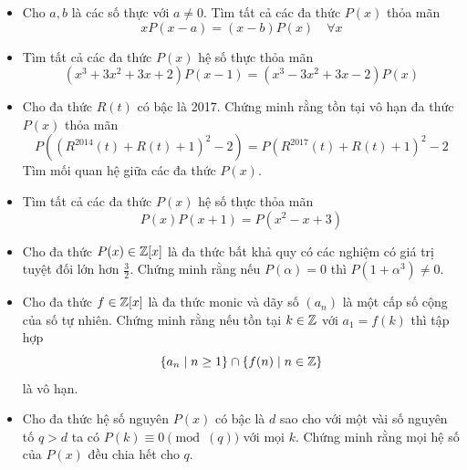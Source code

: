 \documentclass[11pt]{scrartcl}
\begin{document}
\begin{itemize}[label=, leftmargin=0em, itemsep=0.5em]
        \item \begin{btvn} Cho $a,b$ là các số thực với $a \neq 0$. Tìm tất cả các đa thức $P(x)$ thỏa mãn
            $$
            x P(x-a)=(x-b) P(x) \quad \forall x
            $$
        \end{btvn}

        \item \begin{btvn}
            Tìm tất cả các đa thức $P(x)$ hệ số thực thỏa mãn
            \[
                (x^3 + 3x^2 + 3x + 2)P(x - 1) = (x^3 - 3x^2 + 3x -2)P(x)
            \]
        \end{btvn}

        \item \begin{btvn}
            Cho đa thức $R(t)$ có bậc là 2017. Chứng minh rằng tồn tại vô hạn đa thức $P(x)$ thỏa mãn
            \[
                P((R^{2014}(t) + R(t) + 1)^2 - 2) = P(R^{2017}(t) + R(t) + 1)^2 - 2
            \]
            Tìm mối quan hệ giữa các đa thức $P(x)$.
        \end{btvn}

        \item \begin{btvn}
            Tìm tất cả các đa thức $P(x)$ hệ số thực thỏa mãn
            \[
                P(x)P(x + 1) = P(x^2 - x + 3)
            \]
        \end{btvn}

        \item \begin{btvn}
            Cho đa thức $P(x) \in \mathbb{Z}[x]$ là đa thức bất khả quy có các nghiệm có giá trị tuyệt đối lớn hơn $\frac{3}{2}$. Chứng minh rằng nếu $P(\alpha) = 0$ thì $P(1 + \alpha^3) \neq 0$.
        \end{btvn}
        \item \begin{btvn}
            Cho đa thức $f \in \mathbb{Z}[x]$ là đa thức monic và dãy số $(a_n)$ là một cấp số cộng của số tự nhiên. Chứng minh rằng nếu tồn tại $k \in \mathbb{Z}$ với $a_1 = f(k)$ thì tập hợp
            \[
                \{a_n \mid n \geq 1\} \cap \{f(n) \mid n \in \mathbb{Z}\}
            \]
            là vô hạn.
        \end{btvn}

        \item \begin{btvn}
            Cho đa thức hệ số nguyên $P(x)$ có bậc là $d$ sao cho với một vài số nguyên tố $q > d$ ta có $P(k) \equiv 0 \pmod(q)$ với mọi $k$. Chứng minh rằng mọi hệ số của $P(x)$ đều chia hết cho $q$.
        \end{btvn}


\end{itemize}
\end{document}
